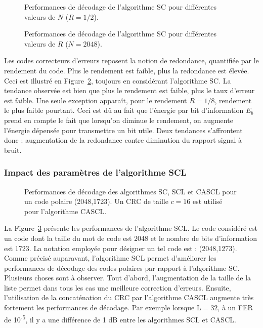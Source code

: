 \begin{figure}[h]
  \centering

\caption{Performances de décodage de l'algorithme SC pour différentes valeurs de $N$ ($R=1/2$).}
\label{fig:sc_n}
\end{figure}

\begin{figure}[h]
  \centering

\caption{Performances de décodage de l'algorithme SC pour différentes valeurs de $R$ ($N=2048$).}
\label{fig:sc_r}
\end{figure}
\clearpage
Les codes correcteurs d'erreurs reposent la notion de redondance, quantifiée par le rendement du code. Plus le rendement est faible, plus la redondance est élevée.
Ceci est illustré en Figure~\ref{fig:sc_r}, toujours en considérant l'algorithme SC. La tendance observée est bien que plus le rendement est faible, plus le taux d'erreur est faible.
Une seule exception apparaît, pour le rendement $R=1/8$, rendement le plus faible pourtant. Ceci est dû au fait que l'énergie par bit d'information $E_b$ prend en compte le fait que lorsqu'on diminue le rendement, on augmente l'énergie dépensée pour transmettre un bit utile. Deux tendances s'affrontent donc : augmentation de la redondance contre diminution du rapport signal à bruit.

\subsubsection{Impact des paramètres de l'algorithme SCL}

\begin{figure}[t]
  \centering
  
  \caption{Performances de décodage des algorithmes SC, SCL et CASCL pour un code polaire (2048,1723). Un CRC de taille $c=16$ est utilisé pour l'algorithme CASCL.}
  \label{fig:scl_l}
\end{figure}
La Figure~\ref{fig:scl_l} présente les performances de l'algorithme SCL. Le code considéré est un code dont la taille du mot de code est 2048 et le nombre de bits d'information est 1723. La notation employée pour désigner un tel code est : (2048,1273). Comme précisé auparavant, l'algorithme SCL permet d'améliorer les performances de décodage des codes polaires par rapport à l'algorithme SC.
Plusieurs choses sont à observer. Tout d'abord, l'augmentation de la taille de la liste permet dans tous les cas une meilleure correction d'erreurs. Ensuite, l'utilisation de la concaténation du CRC par l'algorithme CASCL augmente très fortement les performances de décodage. Par exemple lorsque $\mathrm{L}=32$, à un FER de 10\textsuperscript{-5}, il y a une différence de 1 dB entre les algorithmes SCL et CASCL.

